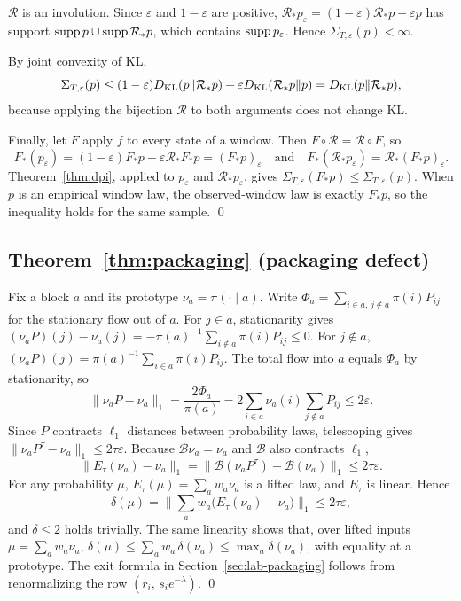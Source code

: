 \(\mathcal R\) is an involution. Since \(\varepsilon\) and \(1-\varepsilon\) are positive, \(\mathcal R_*p_\varepsilon=(1-\varepsilon)\mathcal R_*p+\varepsilon p\) has support \(\operatorname{supp} p\cup\operatorname{supp}\mathcal R_*p\), which contains \(\operatorname{supp} p_\varepsilon\). Hence \(\Sigma_{T,\varepsilon}(p)<\infty\).

By joint convexity of KL,
\[
\Sigma_{T,\varepsilon}(p)\le(1-\varepsilon)D_{\mathrm{KL}}(p\|\mathcal R_*p)+\varepsilon D_{\mathrm{KL}}(\mathcal R_*p\|p)=D_{\mathrm{KL}}(p\|\mathcal R_*p),
\]
because applying the bijection \(\mathcal R\) to both arguments does not change KL.

Finally, let \(F\) apply \(f\) to every state of a window. Then \(F\circ\mathcal R=\mathcal R\circ F\), so
\[
F_*(p_\varepsilon)=(1-\varepsilon)F_*p+\varepsilon\mathcal R_*F_*p=(F_*p)_\varepsilon
\quad\text{and}\quad
F_*(\mathcal R_*p_\varepsilon)=\mathcal R_*(F_*p)_\varepsilon .
\]
Theorem~\ref{thm:dpi}, applied to \(p_\varepsilon\) and \(\mathcal R_*p_\varepsilon\), gives \(\Sigma_{T,\varepsilon}(F_*p)\le\Sigma_{T,\varepsilon}(p)\). When \(p\) is an empirical window law, the observed-window law is exactly \(F_*p\), so the inequality holds for the same sample. \qed

\subsection{Theorem~\ref{thm:packaging} (packaging defect)}

Fix a block \(a\) and its prototype \(\nu_a=\pi(\cdot\mid a)\). Write \(\Phi_a=\sum_{i\in a,\,j\notin a}\pi(i)P_{ij}\) for the stationary flow out of \(a\). For \(j\in a\), stationarity gives \((\nu_aP)(j)-\nu_a(j)=-\pi(a)^{-1}\sum_{i\notin a}\pi(i)P_{ij}\le0\). For \(j\notin a\), \((\nu_aP)(j)=\pi(a)^{-1}\sum_{i\in a}\pi(i)P_{ij}\). The total flow into \(a\) equals \(\Phi_a\) by stationarity, so
\[
\|\nu_aP-\nu_a\|_1=\frac{2\Phi_a}{\pi(a)}=2\sum_{i\in a}\nu_a(i)\sum_{j\notin a}P_{ij}\le2\varepsilon .
\]
Since \(P\) contracts \(\ell_1\) distances between probability laws, telescoping gives \(\|\nu_aP^\tau-\nu_a\|_1\le2\tau\varepsilon\). Because \(\mathcal B\nu_a=\nu_a\) and \(\mathcal B\) also contracts \(\ell_1\),
\[
\|E_\tau(\nu_a)-\nu_a\|_1=\|\mathcal B(\nu_aP^\tau)-\mathcal B(\nu_a)\|_1\le2\tau\varepsilon .
\]
For any probability \(\mu\), \(E_\tau(\mu)=\sum_aw_a\nu_a\) is a lifted law, and \(E_\tau\) is linear. Hence
\[
\delta(\mu)=\Big\|\sum_aw_a\big(E_\tau(\nu_a)-\nu_a\big)\Big\|_1\le2\tau\varepsilon ,
\]
and \(\delta\le2\) holds trivially. The same linearity shows that, over lifted inputs \(\mu=\sum_aw_a\nu_a\), \(\delta(\mu)\le\sum_aw_a\,\delta(\nu_a)\le\max_a\delta(\nu_a)\), with equality at a prototype. The exit formula in Section~\ref{sec:lab-packaging} follows from renormalizing the row \((r_i,\,s_ie^{-\lambda})\). \qed

